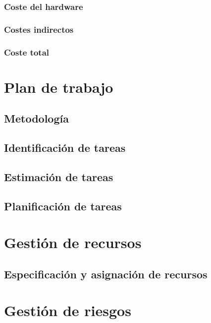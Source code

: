 \documentclass[12pt,a4paper,onecolumn,oneside]{report}
\begin{document}
\subsubsection{Coste del hardware}

\subsubsection{Costes indirectos}

\subsubsection{Coste total}

\section{Plan de trabajo}
\label{Plan de trabajo}

\subsection{Metodología}
\label{Metodología}

\subsection{Identificación de tareas}
\label{Identificación de tareas}

\subsection{Estimación de tareas}
\label{Estimación de tareas}

\subsection{Planificación de tareas}
\label{Planificación de tareas}

\section{Gestión de recursos}
\label{Gestión de recursos}

\subsection{Especificación y asignación de recursos}
\label{Especificación y asignación de recursos}

\section{Gestión de riesgos}
\label{sec:Gestión de riesgos}
\end{document}
